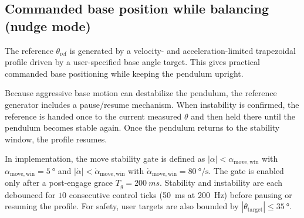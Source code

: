 \subsection*{Commanded base position while balancing (nudge mode)}
The reference $\theta_{\mathrm{ref}}$ is generated by a velocity- and acceleration-limited trapezoidal profile driven by a user-specified base angle target. This gives practical commanded base positioning while keeping the pendulum upright.

Because aggressive base motion can destabilize the pendulum, the reference generator includes a pause/resume mechanism. When instability is confirmed, the reference is handed once to the current measured $\theta$ and then held there until the pendulum becomes stable again. Once the pendulum returns to the stability window, the profile resumes.

In implementation, the move stability gate is defined as $|\alpha|<\alpha_{\mathrm{move,win}}$ with $\alpha_{\mathrm{move,win}}=\SI{5}{\degree}$ and $|\dot{\alpha}|<\dot{\alpha}_{\mathrm{move,win}}$ with $\dot{\alpha}_{\mathrm{move,win}}=\SI{80}{\degree\per\second}$. The gate is enabled only after a post-engage grace $T_g=\SI{200}{ms}$. Stability and instability are each debounced for $10$ consecutive control ticks (\SI{50}{ms} at \SI{200}{Hz}) before pausing or resuming the profile. For safety, user targets are also bounded by $|\theta_{\mathrm{target}}|\le \SI{35}{\degree}$.

